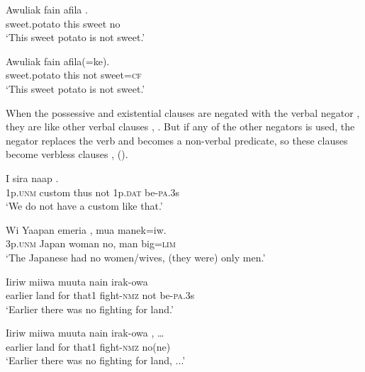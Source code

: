 \ea%
\label{ex:6:x1096}
\gll Awuliak  fain  afila  . \\
sweet.potato  this  sweet  no\\
\glt `This sweet potato is not sweet.'
\z

\ea%
\label{ex:6:x1097}
\gll Awuliak  fain    afila(=ke). \\
sweet.potato  this  not  sweet=\textsc{cf}\\
\glt `This sweet potato is not sweet.'
\z

When the possessive and existential clauses are negated with the verbal negator , they are like other verbal clauses , . But if any of the other negators is used, the negator replaces the verb and becomes a non-verbal predicate, so these clauses become verbless clauses ,  ().

\ea%
\label{ex:6:x1098}
\gll I  sira  naap      . \\
1p.\textsc{unm}  custom  thus  not  1p.\textsc{dat}  be-\textsc{pa}.3s\\
\glt `We do not have a custom like that.'
\z

\ea%
\label{ex:6:x1094}
\gll Wi  Yaapan  emeria  ,  mua  manek=iw. \\
3p.\textsc{unm}  Japan  woman  no,  man  big=\textsc{lim}\\
\glt `The Japanese had no women/wives, (they were) only men.'
\z

\ea%
\label{ex:6:x1099}
\gll Iiriw  miiwa  muuta  nain  irak-owa     \\
earlier  land  for  that1  fight-\textsc{nmz}  not  be-\textsc{pa}.3s\\
\glt `Earlier there was no fighting for land.'
\z

\ea%
\label{ex:6:x1100}
\gll Iiriw  miiwa  muuta  nain  irak-owa  , {\dots} \\
earlier  land  for  that1  fight-\textsc{nmz}  no(ne)\\
\glt `Earlier there was no fighting for land, ...'
\z

